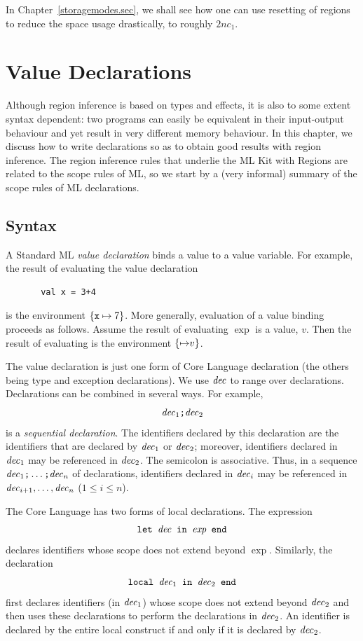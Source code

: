\documentclass[12pt]{book}
\begin{document}
In Chapter~\ref{storagemodes.sec}, we shall see how one can use resetting of
regions to reduce the space usage drastically, to roughly $2nc_1$.

\chapter{Value Declarations}
\label{valdecl.sec}

Although region inference is based on types and effects, it is also
to some extent syntax dependent: two programs can easily be equivalent
in their input-output behaviour and yet result in very different memory
behaviour. In this chapter, we discuss how to write 
%
declarations so as to obtain good results with region inference. The
region inference rules that underlie the ML Kit with Regions are
related to the scope rules of ML, so we start by a (very informal)
summary of the scope rules of ML declarations.
\section{Syntax}
A Standard ML  {\em value declaration} binds a value 
to a value 
%
variable. For example, the result of evaluating the value declaration
\begin{verbatim}
       val x = 3+4
\end{verbatim}
is the environment $\{\hbox{\tt x}\mapsto 7\}$. More generally,
evaluation of a value binding  proceeds
as follows. Assume the result of evaluating $\exp$ is a value, $v$.
Then the result of evaluating  is the
environment $\{{\it \mapsto} v\}$.

The value declaration is just one form of Core Language declaration 
(the others being type and exception declarations). We use ${\it dec}$ to
range over declarations. Declarations can be
combined in several ways. For example, 
$${\it dec}_1\hbox{\tt ;}{\it dec}_2$$
is a {\em sequential declaration}. The identifiers declared by this
declaration are the identifiers that are declared by ${\it dec}_1$ or ${\it dec}_2$;
moreover, identifiers declared in ${\it dec}_1$ may be referenced in ${\it dec}_2$.
The semicolon is associative. Thus, in a sequence 
${\it dec}_1\hbox{\tt ;}\ldots\hbox{\tt ;}{\it dec}_n$
of declarations, identifiers declared in 
${\it dec}_i$ may be referenced in ${\it dec}_{i+1},\ldots
,{\it dec}_n$ ($1\leq i\leq n$). 

The Core Language has two forms of local declarations. The
expression 
$$\hbox{\tt let ${\it dec}$ in $\hbox{\it exp}$ end}$$
declares identifiers whose scope does not extend beyond $\exp$. Similarly,
the declaration
$$\hbox{\tt local ${\it dec}_1$ in ${\it dec}_2$ end}$$
first declares identifiers (in ${\it dec}_1$) whose scope does not extend beyond
${\it dec}_2$ and then uses these declarations to perform the declarations in
${\it dec}_2$. An identifier is declared by the entire local construct if and only
if it is declared by ${\it dec}_2$.
\end{document}
